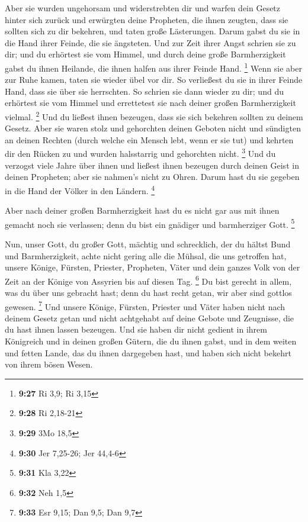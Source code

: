  Aber sie wurden ungehorsam und widerstrebten dir und
warfen dein Gesetz hinter sich zurück und erwürgten deine Propheten, die
ihnen zeugten, dass sie sollten sich zu dir bekehren, und taten große
Lästerungen.  Darum gabst du sie in die Hand ihrer Feinde,
die sie ängsteten. Und zur Zeit ihrer Angst schrien sie zu dir; und du
erhörtest sie vom Himmel, und durch deine große Barmherzigkeit gabst du
ihnen Heilande, die ihnen halfen aus ihrer Feinde Hand. \footnote{\textbf{9:27}
  Ri 3,9; Ri 3,15}  Wenn sie aber zur Ruhe kamen, taten sie
wieder übel vor dir. So verließest du sie in ihrer Feinde Hand, dass sie
über sie herrschten. So schrien sie dann wieder zu dir; und du erhörtest
sie vom Himmel und errettetest sie nach deiner großen Barmherzigkeit
vielmal. \footnote{\textbf{9:28} Ri 2,18-21}  Und du
ließest ihnen bezeugen, dass sie sich bekehren sollten zu deinem Gesetz.
Aber sie waren stolz und gehorchten deinen Geboten nicht und sündigten
an deinen Rechten (durch welche ein Mensch lebt, wenn er sie tut) und
kehrten dir den Rücken zu und wurden halsstarrig und gehorchten nicht.
\footnote{\textbf{9:29} 3Mo 18,5}  Und du verzogst viele
Jahre über ihnen und ließest ihnen bezeugen durch deinen Geist in deinen
Propheten; aber sie nahmen's nicht zu Ohren. Darum hast du sie gegeben
in die Hand der Völker in den Ländern. \footnote{\textbf{9:30} Jer
  7,25-26; Jer 44,4-6}

 Aber nach deiner großen Barmherzigkeit hast du es nicht
gar aus mit ihnen gemacht noch sie verlassen; denn du bist ein gnädiger
und barmherziger Gott. \footnote{\textbf{9:31} Kla 3,22}

 Nun, unser Gott, du großer Gott, mächtig und schrecklich,
der du hältst Bund und Barmherzigkeit, achte nicht gering alle die
Mühsal, die uns getroffen hat, unsere Könige, Fürsten, Priester,
Propheten, Väter und dein ganzes Volk von der Zeit an der Könige von
Assyrien bis auf diesen Tag. \footnote{\textbf{9:32} Neh 1,5}
 Du bist gerecht in allem, was du über uns gebracht hast;
denn du hast recht getan, wir aber sind gottlos gewesen. \footnote{\textbf{9:33}
  Esr 9,15; Dan 9,5; Dan 9,7}  Und unsere Könige, Fürsten,
Priester und Väter haben nicht nach deinem Gesetz getan und nicht
achtgehabt auf deine Gebote und Zeugnisse, die du hast ihnen lassen
bezeugen.  Und sie haben dir nicht gedient in ihrem
Königreich und in deinen großen Gütern, die du ihnen gabst, und in dem
weiten und fetten Lande, das du ihnen dargegeben hast, und haben sich
nicht bekehrt von ihrem bösen Wesen.

